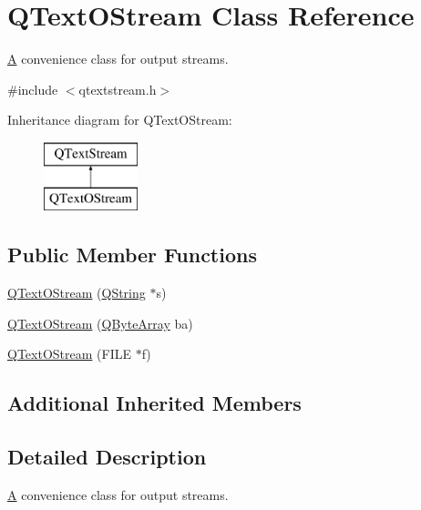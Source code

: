 \hypertarget{class_q_text_o_stream}{}\section{Q\+Text\+O\+Stream Class Reference}
\label{class_q_text_o_stream}


\mbox{\hyperlink{class_a}{A}} convenience class for output streams.  




{\ttfamily \#include $<$qtextstream.\+h$>$}

Inheritance diagram for Q\+Text\+O\+Stream\+:\begin{figure}[H]
\begin{center}
\leavevmode
\includegraphics[height=2.000000cm]{class_q_text_o_stream}
\end{center}
\end{figure}
\subsection*{Public Member Functions}
\begin{DoxyCompactItemize}
\item 
\mbox{\hyperlink{class_q_text_o_stream_a8d26b74ba9b234926bb03c369f8f2df5}{Q\+Text\+O\+Stream}} (\mbox{\hyperlink{class_q_string}{Q\+String}} $\ast$s)
\item 
\mbox{\hyperlink{class_q_text_o_stream_a048dde107de3d3bf8b01f9fe5c7da1ae}{Q\+Text\+O\+Stream}} (\mbox{\hyperlink{class_q_array}{Q\+Byte\+Array}} ba)
\item 
\mbox{\hyperlink{class_q_text_o_stream_a9ae5cb7afb0fea378476e2607fd9ee30}{Q\+Text\+O\+Stream}} (F\+I\+LE $\ast$f)
\end{DoxyCompactItemize}
\subsection*{Additional Inherited Members}


\subsection{Detailed Description}
\mbox{\hyperlink{class_a}{A}} convenience class for output streams. 

